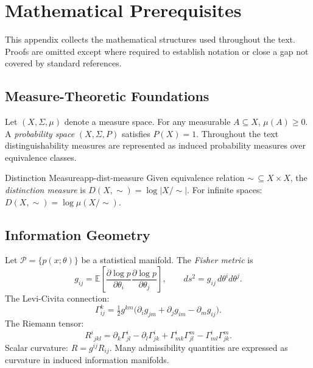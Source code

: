 \documentclass[12pt,twoside,openright]{book}
\begin{document}
\backmatter

\appendix

\chapter{Mathematical Prerequisites}
\label{app:math}

This appendix collects the mathematical structures used
throughout the text. Proofs are omitted except where
required to establish notation or close a gap not covered
by standard references.

\section{Measure-Theoretic Foundations}

Let $(X, \Sigma, \mu)$ denote a measure space.
For any measurable $A \subseteq X$, $\mu(A) \ge 0$.
A \emph{probability space} $(X, \Sigma, P)$ satisfies
$P(X) = 1$.
Throughout the text distinguishability measures are
represented as induced probability measures over
equivalence classes.

\begin{definition}{Distinction Measure}{app-dist-measure}
  Given equivalence relation $\sim\,\subseteq X \times X$,
  the \emph{distinction measure} is
  $D(X, \sim) = \log |X/{\sim}|$.
  For infinite spaces: $D(X, \sim) = \log \mu(X/{\sim})$.
\end{definition}

\section{Information Geometry}

Let $\mathcal{P} = \{p(x;\theta)\}$ be a statistical
manifold. The \emph{Fisher metric} is
\[
  g_{ij}
  = \mathbb{E}\!\left[
      \frac{\partial\log p}{\partial\theta_i}
      \frac{\partial\log p}{\partial\theta_j}
    \right],
  \qquad
  ds^2 = g_{ij}\,d\theta^i d\theta^j.
\]
The Levi-Civita connection:
\[
  \Gamma^k_{ij}
  = \tfrac{1}{2} g^{km}
    \bigl(\partial_i g_{jm} + \partial_j g_{im}
          - \partial_m g_{ij}\bigr).
\]
The Riemann tensor:
\[
  R^i{}_{\!jkl}
  = \partial_k\Gamma^i_{jl} - \partial_l\Gamma^i_{jk}
  + \Gamma^i_{mk}\Gamma^m_{jl}
  - \Gamma^i_{ml}\Gamma^m_{jk}.
\]
Scalar curvature: $R = g^{ij}R_{ij}$.
Many admissibility quantities are expressed as curvature
in induced information manifolds.
\end{document}
